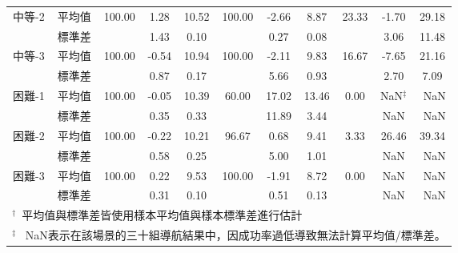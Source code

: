 \begin{sidewaystable}[htbp]
\begin{tabular}{ccccccccccc}
\multirow{2}{*}{中等-2} & 平均值                  & 100.00 & 1.28    & 10.52                     & 100.00 & -2.66   & 8.87                      & 23.33  & -1.70   & 29.18                     \\
                      & 標準差                  &        & 1.43    & 0.10                      &        & 0.27    & 0.08                      &        & 3.06    & 11.48                     \\
\multirow{2}{*}{中等-3} & 平均值                  & 100.00 & -0.54   & 10.94                     & 100.00 & -2.11   & 9.83                      & 16.67  & -7.65   & 21.16                     \\
                      & 標準差                  &        & 0.87    & 0.17                      &        & 5.66    & 0.93                      &        & 2.70    & 7.09                      \\ \hline
\multirow{2}{*}{困難-1} & 平均值                  & 100.00 & -0.05   & 10.39                     & 60.00  & 17.02   & 13.46                     & 0.00   & NaN$^\ddagger$     & \multicolumn{1}{r}{NaN}   \\
                      & 標準差                  &        & 0.35    & 0.33                      &        & 11.89   & 3.44                      &        & NaN     & \multicolumn{1}{r}{NaN}   \\
\multirow{2}{*}{困難-2} & 平均值                  & 100.00 & -0.22   & 10.21                     & 96.67  & 0.68    & 9.41                      & 3.33   & 26.46   & 39.34                     \\
                      & 標準差                  &        & 0.58    & 0.25                      &        & 5.00    & 1.01                      &        & NaN     & \multicolumn{1}{r}{NaN}   \\
\multirow{2}{*}{困難-3} & 平均值                  & 100.00 & 0.22    & 9.53                      & 100.00 & -1.91   & 8.72                      & 0.00   & NaN     & \multicolumn{1}{r}{NaN}   \\
                      & 標準差                  &        & 0.31    & 0.10                      &        & 0.51    & 0.13                      &        & NaN     & \multicolumn{1}{r}{NaN}   \\ \hline
\multicolumn{11}{l}{$^\dagger$~平均值與標準差皆使用樣本平均值與樣本標準差進行估計}\\
\multicolumn{11}{l}{$^\ddagger$~ NaN表示在該場景的三十組導航結果中，因成功率過低導致無法計算平均值/標準差。}
\end{tabular}
\end{sidewaystable}